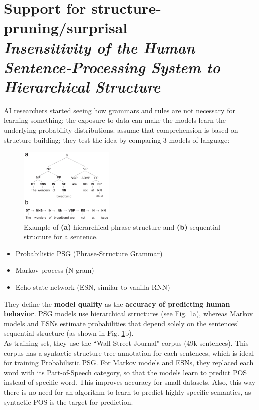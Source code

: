 \section[Support for structure-pruning/surprisal]{Support for structure-pruning/surprisal\\ \textit{Insensitivity of the Human Sentence-Processing System to Hierarchical Structure}\\
}
AI researchers started seeing how grammars and rules are not necessary for learning something: the exposure to data can make the models learn the underlying probability distributions. \cite{frank} assume that comprehension is based on structure building; they test the idea by comparing 3 models of language:

\begin{figure}
  \centering
  \includegraphics[width=0.4\textwidth]{images/frank.png}
  \caption{Example of \textbf{(a)} hierarchical phrase structure and \textbf{(b)} sequential structure for a sentence.}
  \label{fig:frank}
\end{figure}
\begin{itemize}
    \item Probabilistic PSG (Phrase-Structure Grammar)
    \item Markov process (N-gram)
    \item Echo state network (ESN, similar to vanilla RNN)
\end{itemize}
They define the \textbf{model quality} as the \textbf{accuracy of predicting human behavior}. PSG models use hierarchical structures (see Fig. \ref{fig:frank}a), whereas Markov models and ESNs estimate probabilities that depend solely on the sentences' sequential structure (as shown in Fig. \ref{fig:frank}b).\\

As training set, they use the ``Wall Street Journal" corpus (49k sentences). This corpus has a syntactic-structure tree annotation for each sentences, which is ideal for training Probabilistic PSG.
For Markov models and ESNs, they replaced each word with its Part-of-Speech category, so that the models learn to predict POS instead of specific word. This improves accuracy for small 
datasets. Also, this way there is no need for an algorithm to learn to predict highly specific semantics, as syntactic POS is the target for prediction.

